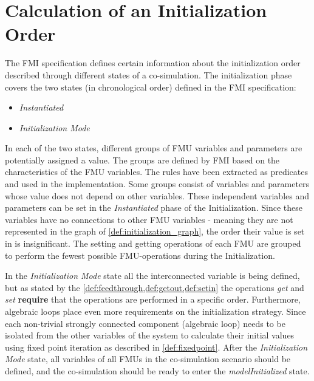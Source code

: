 \section{Calculation of an Initialization Order}\label{sc:initilization}
The FMI specification defines certain information about the initialization order described through different states of a co-simulation. The initialization phase covers the two states (in chronological order) defined in the FMI specification:
\begin{itemize}
    \item \textit{Instantiated}
    \item \textit{Initialization Mode}
\end{itemize}
In each of the two states, different groups of FMU variables and parameters are potentially assigned a value. The groups are defined by FMI based on the characteristics of the FMU variables. The rules have been extracted as predicates and used in the implementation. 
Some groups consist of variables and parameters whose value does not depend on other variables. These independent variables and parameters can be set in the \textit{Instantiated} phase of the Initialization. Since these variables have no connections to other FMU variables - meaning they are not represented in the graph of \cref{def:initialization_graph}, the order their value is set in is insignificant. 
The setting and getting operations of each FMU are grouped to perform the fewest possible FMU-operations during the Initialization. 

In the \textit{Initialization Mode} state all the interconnected variable is being defined, but as stated by the \cref{def:feedthrough,def:getout,def:setin} the operations \textit{get} and \textit{set} \textbf{require} that the operations are performed in a specific order. Furthermore, algebraic loops place even more requirements on the initialization strategy. Since each non-trivial strongly connected component (algebraic loop) needs to be isolated from the other variables of the system to calculate their initial values using fixed point iteration as described in \cref{def:fixedpoint}. 
After the \textit{Initialization Mode} state, all variables of all FMUs in the co-simulation scenario should be defined, and the co-simulation should be ready to enter the \textit{modelInitialized} state.


